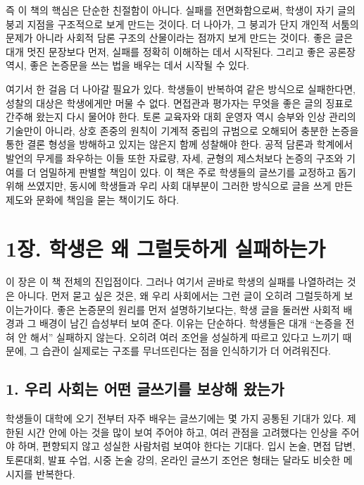 즉 이 책의 핵심은 단순한 친절함이 아니다. 실패를 전면화함으로써, 학생이 자기 글의 붕괴 지점을 구조적으로 보게 만드는 것이다. 더 나아가, 그 붕괴가 단지 개인적 서툼의 문제가 아니라 사회적 담론 구조의 산물이라는 점까지 보게 만드는 것이다. 좋은 글은 대개 멋진 문장보다 먼저, 실패를 정확히 이해하는 데서 시작된다. 그리고 좋은 공론장 역시, 좋은 논증문을 쓰는 법을 배우는 데서 시작될 수 있다.

여기서 한 걸음 더 나아갈 필요가 있다. 학생들이 반복하여 같은 방식으로 실패한다면, 성찰의 대상은 학생에게만 머물 수 없다. 면접관과 평가자는 무엇을 좋은 글의 징표로 간주해 왔는지 다시 물어야 한다. 토론 교육자와 대회 운영자 역시 승부와 인상 관리의 기술만이 아니라, 상호 존중의 원칙이 기계적 중립의 규범으로 오해되어 충분한 논증을 통한 결론 형성을 방해하고 있지는 않은지 함께 성찰해야 한다. 공적 담론과 학계에서 발언의 무게를 좌우하는 이들 또한 자료량, 자세, 균형의 제스처보다 논증의 구조와 기여를 더 엄밀하게 판별할 책임이 있다. 이 책은 주로 학생들의 글쓰기를 교정하고 돕기 위해 쓰였지만, 동시에 학생들과 우리 사회 대부분이 그러한 방식으로 글을 쓰게 만든 제도와 문화에 책임을 묻는 책이기도 하다.

\chapter{1장. 학생은 왜 그럴듯하게 실패하는가}\label{1uxc7a5-uxd559uxc0dduxc740-uxc65c-uxadf8uxb7f4uxb4efuxd558uxac8c-uxc2e4uxd328uxd558uxb294uxac00}

이 장은 이 책 전체의 진입점이다. 그러나 여기서 곧바로 학생의 실패를 나열하려는 것은 아니다. 먼저 묻고 싶은 것은, 왜 우리 사회에서는 그런 글이 오히려 그럴듯하게 보이는가이다. 좋은 논증문의 원리를 먼저 설명하기보다는, 학생 글을 둘러싼 사회적 배경과 그 배경이 남긴 습성부터 보여 준다. 이유는 단순하다. 학생들은 대개 ``논증을 전혀 안 해서'' 실패하지 않는다. 오히려 여러 조언을 성실하게 따르고 있다고 느끼기 때문에, 그 습관이 실제로는 구조를 무너뜨린다는 점을 인식하기가 더 어려워진다.

\section{1. 우리 사회는 어떤 글쓰기를 보상해 왔는가}\label{1-uxc6b0uxb9ac-uxc0acuxd68cuxb294-uxc5b4uxb5a4-uxae00uxc4f0uxae30uxb97c-uxbcf4uxc0c1uxd574-uxc654uxb294uxac00}

학생들이 대학에 오기 전부터 자주 배우는 글쓰기에는 몇 가지 공통된 기대가 있다. 제한된 시간 안에 아는 것을 많이 보여 주어야 하고, 여러 관점을 고려했다는 인상을 주어야 하며, 편향되지 않고 성실한 사람처럼 보여야 한다는 기대다. 입시 논술, 면접 답변, 토론대회, 발표 수업, 시중 논술 강의, 온라인 글쓰기 조언은 형태는 달라도 비슷한 메시지를 반복한다.

